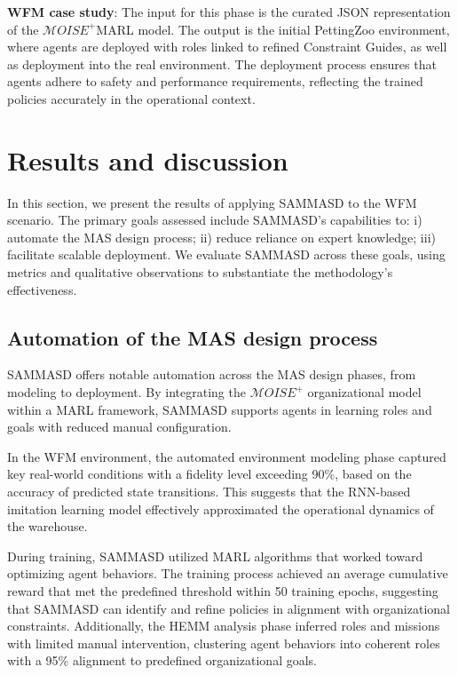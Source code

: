 \documentclass[sigconf,anonymous]{aamas}
\begin{document}
\textbf{WFM case study}: The input for this phase is the curated JSON representation of the $\mathcal{M}OISE^+$MARL model. The output is the initial PettingZoo environment, where agents are deployed with roles linked to refined Constraint Guides, as well as deployment into the real environment. The deployment process ensures that agents adhere to safety and performance requirements, reflecting the trained policies accurately in the operational context.

\section{Results and discussion}
\label{sec:results_discussion}

In this section, we present the results of applying SAMMASD to the WFM scenario. The primary goals assessed include SAMMASD's capabilities to: \quad i) automate the MAS design process; \quad ii) reduce reliance on expert knowledge; \quad iii) facilitate scalable deployment. We evaluate SAMMASD across these goals, using metrics and qualitative observations to substantiate the methodology's effectiveness.

\subsection{Automation of the MAS design process}

SAMMASD offers notable automation across the MAS design phases, from modeling to deployment. By integrating the $\mathcal{M}OISE^+$ organizational model within a MARL framework, SAMMASD supports agents in learning roles and goals with reduced manual configuration.

In the WFM environment, the automated environment modeling phase captured key real-world conditions with a fidelity level exceeding 90\%, based on the accuracy of predicted state transitions. This suggests that the RNN-based imitation learning model effectively approximated the operational dynamics of the warehouse.

During training, SAMMASD utilized MARL algorithms that worked toward optimizing agent behaviors. The training process achieved an average cumulative reward that met the predefined threshold within 50 training epochs, suggesting that SAMMASD can identify and refine policies in alignment with organizational constraints. Additionally, the HEMM analysis phase inferred roles and missions with limited manual intervention, clustering agent behaviors into coherent roles with a 95\% alignment to predefined organizational goals.
\end{document}
